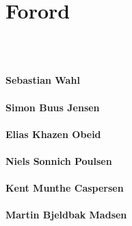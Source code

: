 \chapter*{Forord}
\label{forord}







\mbox{ }
\begin{center}
\begin{multicols}{2}
\vspace{1cm}
\makebox[2.5in]{\hrulefill}\\
\textbf{Sebastian Wahl}\\
\vspace{1cm}
\makebox[2.5in]{\hrulefill}\\
\textbf{Simon Buus Jensen}\\
\vspace{1cm}
\makebox[2.5in]{\hrulefill}\\
\textbf{Elias Khazen Obeid} \\
\vspace{1cm}
\vfill
\columnbreak
\vspace{1cm}
\makebox[2.5in]{\hrulefill}\\
\textbf{Niels Sonnich Poulsen}\\
\vspace{1cm}
\makebox[2.5in]{\hrulefill}\\
\textbf{Kent Munthe Caspersen}\\
\vspace{1cm}
\makebox[2.5in]{\hrulefill}\\
\textbf{Martin Bjeldbak Madsen}\\
\end{multicols}
\end{center}
